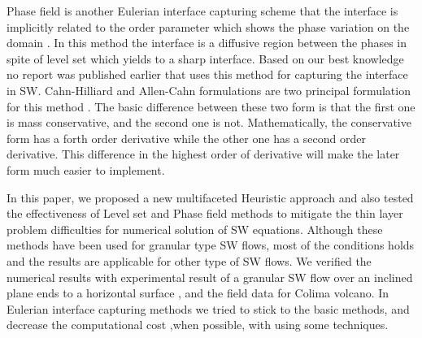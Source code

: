 \documentclass[letterpaper,10pt]{article}
\begin{document}
Phase field is another Eulerian interface capturing scheme that the interface is implicitly related to the order parameter which shows the phase variation on the domain \cite{Anderson1998}. In this method the interface is a diffusive region between the phases in spite of level set which yields to a sharp interface. Based on our best knowledge no report was published earlier that uses this method for capturing the interface in SW.
Cahn-Hilliard and Allen-Cahn formulations are two principal formulation for this method \cite{CahnHilliard1958i,CahnHilliard1958ii,Yang2006}. The basic difference between these two form is that the first one is mass conservative, and the second one is not. Mathematically, the conservative form has a forth order derivative while the other one has a second order derivative. This difference in the highest order of derivative will make the later form much easier to implement.\newline


In this paper, we proposed a new multifaceted Heuristic approach and also tested the effectiveness of Level set and Phase field methods to mitigate the thin layer problem difficulties for numerical solution of SW equations. Although these methods have been used for granular type SW flows, most of the conditions holds and the results are applicable for other type of SW flows.  We verified the numerical results with experimental result of a granular SW flow over an inclined plane ends to a horizontal surface , and the field data for Colima volcano.
In Eulerian interface capturing methods we tried to stick to the basic methods, and decrease the computational cost ,when possible, with using some techniques. \newline
\end{document}
